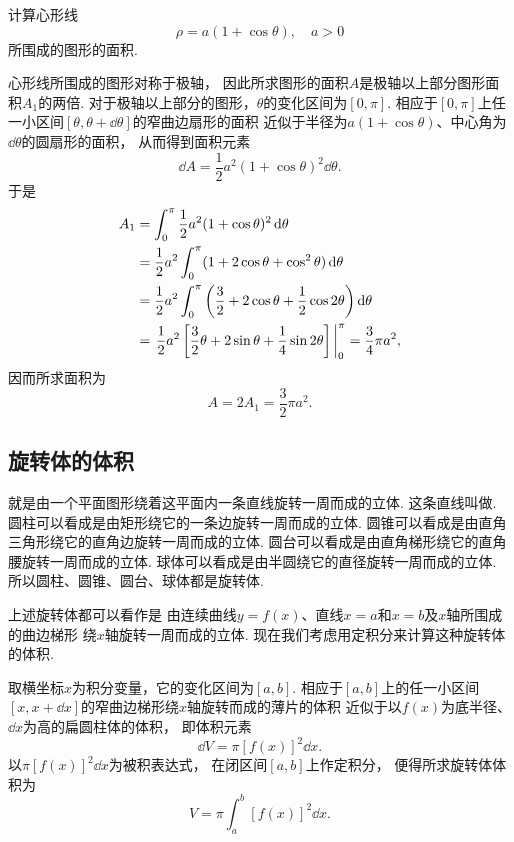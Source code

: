 \begin{example}
计算心形线\[
	\rho = a (1 + \cos\theta), \quad a>0
\]所围成的图形的面积.
\begin{solution}
心形线所围成的图形对称于极轴，
因此所求图形的面积\(A\)是极轴以上部分图形面积\(A_1\)的两倍.
对于极轴以上部分的图形，\(\theta\)的变化区间为\([0,\pi]\).
相应于\([0,\pi]\)上任一小区间\([\theta,\theta+\dd{\theta}]\)的窄曲边扇形的面积
近似于半径为\(a (1 + \cos\theta)\)、中心角为\(\dd{\theta}\)的圆扇形的面积，
从而得到面积元素\[
	\dd{A} = \frac12 a^2 (1 + \cos\theta)^2 \dd{\theta}.
\]
于是\begin{align*}
	A_1 &= \int_0^\pi \frac12 a^2 (1 + \cos\theta)^2 \dd{\theta} \\
	&= \frac12 a^2 \int_0^\pi (1 + 2\cos\theta + \cos^2\theta) \dd{\theta} \\
	&= \frac12 a^2 \int_0^\pi \left(\frac32 + 2 \cos\theta + \frac12 \cos2\theta\right) \dd{\theta} \\
	&= \eval{\frac12 a^2 \left[\frac32 \theta + 2 \sin\theta + \frac14 \sin2\theta\right]}_0^\pi
	= \frac34 \pi a^2,
\end{align*}
因而所求面积为\[
	A = 2 A_1 = \frac32 \pi a^2.
\]
\end{solution}
\end{example}

\subsection{旋转体的体积}
就是由一个平面图形绕着这平面内一条直线旋转一周而成的立体.
这条直线叫做.
圆柱可以看成是由矩形绕它的一条边旋转一周而成的立体.
圆锥可以看成是由直角三角形绕它的直角边旋转一周而成的立体.
圆台可以看成是由直角梯形绕它的直角腰旋转一周而成的立体.
球体可以看成是由半圆绕它的直径旋转一周而成的立体.
所以圆柱、圆锥、圆台、球体都是旋转体.

上述旋转体都可以看作是
由连续曲线\(y=f(x)\)、直线\(x=a\)和\(x=b\)及\(x\)轴所围成的曲边梯形
绕\(x\)轴旋转一周而成的立体.
现在我们考虑用定积分来计算这种旋转体的体积.

取横坐标\(x\)为积分变量，它的变化区间为\([a,b]\).
相应于\([a,b]\)上的任一小区间\([x,x+\dd{x}]\)的窄曲边梯形绕\(x\)轴旋转而成的薄片的体积
近似于以\(f(x)\)为底半径、\(\dd{x}\)为高的扁圆柱体的体积，
即体积元素\[
	\dd{V} = \pi [f(x)]^2 \dd{x}.
\]
以\(\pi [f(x)]^2 \dd{x}\)为被积表达式，
在闭区间\([a,b]\)上作定积分，
便得所求旋转体体积为\begin{equation}\label{equation:定积分.曲边梯形绕x轴旋转体的体积}
	V = \pi \int_a^b [f(x)]^2 \dd{x}.
\end{equation}

